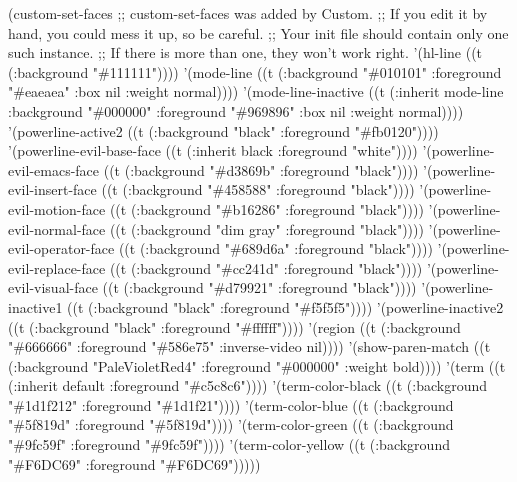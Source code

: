 \documentclass[11pt]{article}
\begin{document}
(custom-set-faces
 ;; custom-set-faces was added by Custom.
 ;; If you edit it by hand, you could mess it up, so be careful.
 ;; Your init file should contain only one such instance.
 ;; If there is more than one, they won't work right.
 '(hl-line ((t (:background "\#111111"))))
 '(mode-line ((t (:background "\#010101" :foreground "\#eaeaea" :box nil :weight normal))))
 '(mode-line-inactive ((t (:inherit mode-line :background "\#000000" :foreground "\#969896" :box nil :weight normal))))
 '(powerline-active2 ((t (:background "black" :foreground "\#fb0120"))))
 '(powerline-evil-base-face ((t (:inherit black :foreground "white"))))
 '(powerline-evil-emacs-face ((t (:background "\#d3869b" :foreground "black"))))
 '(powerline-evil-insert-face ((t (:background "\#458588" :foreground "black"))))
 '(powerline-evil-motion-face ((t (:background "\#b16286" :foreground "black"))))
 '(powerline-evil-normal-face ((t (:background "dim gray" :foreground "black"))))
 '(powerline-evil-operator-face ((t (:background "\#689d6a" :foreground "black"))))
 '(powerline-evil-replace-face ((t (:background "\#cc241d" :foreground "black"))))
 '(powerline-evil-visual-face ((t (:background "\#d79921" :foreground "black"))))
 '(powerline-inactive1 ((t (:background "black" :foreground "\#f5f5f5"))))
 '(powerline-inactive2 ((t (:background "black" :foreground "\#ffffff"))))
 '(region ((t (:background "\#666666" :foreground "\#586e75" :inverse-video nil))))
 '(show-paren-match ((t (:background "PaleVioletRed4" :foreground "\#000000" :weight bold))))
 '(term ((t (:inherit default :foreground "\#c5c8c6"))))
 '(term-color-black ((t (:background "\#1d1f212" :foreground "\#1d1f21"))))
 '(term-color-blue ((t (:background "\#5f819d" :foreground "\#5f819d"))))
 '(term-color-green ((t (:background "\#9fc59f" :foreground "\#9fc59f"))))
 '(term-color-yellow ((t (:background "\#F6DC69" :foreground "\#F6DC69")))))
\end{document}
